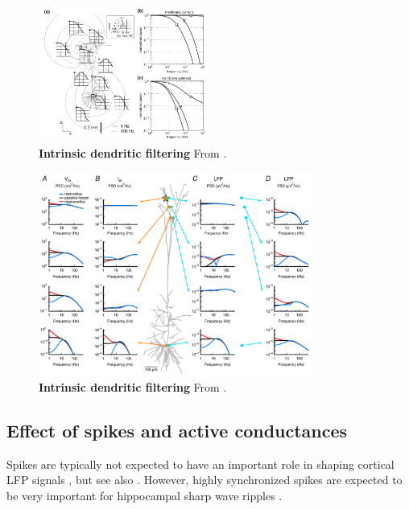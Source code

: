 \documentclass[preprint,11pt,authoryear]{elsarticle}
\begin{document}
\begin{figure}[h!]
\begin{center}
\includegraphics[width=0.5\textwidth]{intrinsic_dendritic_filtering.png}
\end{center}
\caption{\textbf{Intrinsic dendritic filtering} From \cite{Linden2010}.}
\label{fig:intrinsic}
\end{figure}

\begin{figure}[h!]
\begin{center}
\includegraphics[width=0.8\textwidth]{hay_intrinsic.png}
\end{center}
\caption{\textbf{Intrinsic dendritic filtering} From \cite{Ness2016}.}
\label{fig:intrinsic2}
\end{figure}

\subsection{Effect of spikes and active conductances}
\label{sec:active}
Spikes are typically not expected to have an important role in shaping cortical LFP signals \citep{Einevoll2013, Haider2016}, but see also \cite{Reimann2013}.
However, highly synchronized spikes are expected to be very important for hippocampal sharp wave ripples \citep{Schomburg2012, Luo2018}. 
\end{document}
